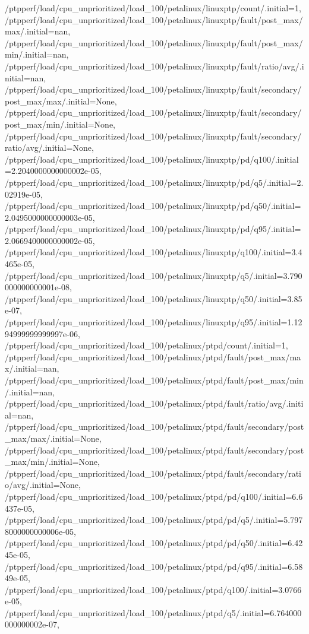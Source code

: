 {    /ptpperf/load/cpu_unprioritized/load_100/petalinux/linuxptp/count/.initial=1,
    /ptpperf/load/cpu_unprioritized/load_100/petalinux/linuxptp/fault/post_max/max/.initial=nan,
    /ptpperf/load/cpu_unprioritized/load_100/petalinux/linuxptp/fault/post_max/min/.initial=nan,
    /ptpperf/load/cpu_unprioritized/load_100/petalinux/linuxptp/fault/ratio/avg/.initial=nan,
    /ptpperf/load/cpu_unprioritized/load_100/petalinux/linuxptp/fault/secondary/post_max/max/.initial=None,
    /ptpperf/load/cpu_unprioritized/load_100/petalinux/linuxptp/fault/secondary/post_max/min/.initial=None,
    /ptpperf/load/cpu_unprioritized/load_100/petalinux/linuxptp/fault/secondary/ratio/avg/.initial=None,
    /ptpperf/load/cpu_unprioritized/load_100/petalinux/linuxptp/pd/q100/.initial=2.2040000000000002e-05,
    /ptpperf/load/cpu_unprioritized/load_100/petalinux/linuxptp/pd/q5/.initial=2.02919e-05,
    /ptpperf/load/cpu_unprioritized/load_100/petalinux/linuxptp/pd/q50/.initial=2.0495000000000003e-05,
    /ptpperf/load/cpu_unprioritized/load_100/petalinux/linuxptp/pd/q95/.initial=2.0669400000000002e-05,
    /ptpperf/load/cpu_unprioritized/load_100/petalinux/linuxptp/q100/.initial=3.4465e-05,
    /ptpperf/load/cpu_unprioritized/load_100/petalinux/linuxptp/q5/.initial=3.790000000000001e-08,
    /ptpperf/load/cpu_unprioritized/load_100/petalinux/linuxptp/q50/.initial=3.85e-07,
    /ptpperf/load/cpu_unprioritized/load_100/petalinux/linuxptp/q95/.initial=1.1294999999999997e-06,
    /ptpperf/load/cpu_unprioritized/load_100/petalinux/ptpd/count/.initial=1,
    /ptpperf/load/cpu_unprioritized/load_100/petalinux/ptpd/fault/post_max/max/.initial=nan,
    /ptpperf/load/cpu_unprioritized/load_100/petalinux/ptpd/fault/post_max/min/.initial=nan,
    /ptpperf/load/cpu_unprioritized/load_100/petalinux/ptpd/fault/ratio/avg/.initial=nan,
    /ptpperf/load/cpu_unprioritized/load_100/petalinux/ptpd/fault/secondary/post_max/max/.initial=None,
    /ptpperf/load/cpu_unprioritized/load_100/petalinux/ptpd/fault/secondary/post_max/min/.initial=None,
    /ptpperf/load/cpu_unprioritized/load_100/petalinux/ptpd/fault/secondary/ratio/avg/.initial=None,
    /ptpperf/load/cpu_unprioritized/load_100/petalinux/ptpd/pd/q100/.initial=6.6437e-05,
    /ptpperf/load/cpu_unprioritized/load_100/petalinux/ptpd/pd/q5/.initial=5.7978000000000006e-05,
    /ptpperf/load/cpu_unprioritized/load_100/petalinux/ptpd/pd/q50/.initial=6.4245e-05,
    /ptpperf/load/cpu_unprioritized/load_100/petalinux/ptpd/pd/q95/.initial=6.5849e-05,
    /ptpperf/load/cpu_unprioritized/load_100/petalinux/ptpd/q100/.initial=3.0766e-05,
    /ptpperf/load/cpu_unprioritized/load_100/petalinux/ptpd/q5/.initial=6.764000000000002e-07,
}
